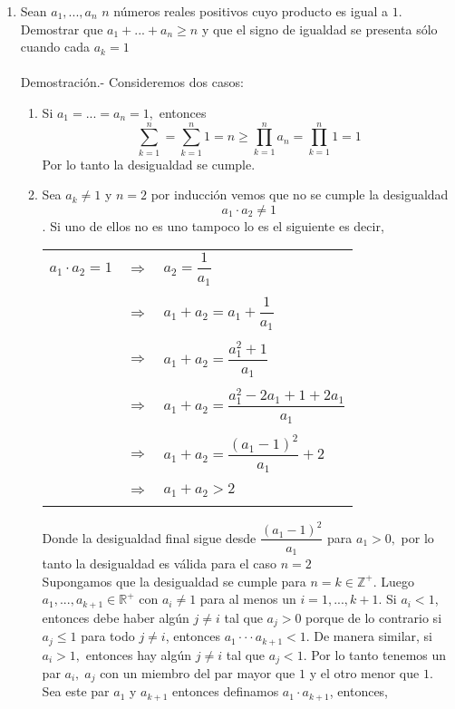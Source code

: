 \begin{enumerate}
\item Sean $a_1,...,a_n$  $n$ números reales positivos cuyo producto es igual a $1$. Demostrar que $a_1+...+a_n \geq n$ y que el signo de igualdad se presenta sólo cuando cada $a_k =1$\\\\
Demostración.- \; Consideremos dos casos:
\begin{enumerate}[C1]
\item Si $a_1=...=a_n=1,$ entonces 
$$\sum\limits_{k=1}^n = \sum\limits_{k=1}^n 1 = n \geq \prod\limits_{k=1}^n a_n = \prod\limits_{k=1}^n 1 = 1 $$
Por lo tanto la desigualdad se cumple.
\item Sea $a_k \neq 1$ y $n=2$ por inducción vemos que no se cumple la desigualdad $$a_1 \cdot a_2 \neq 1$$. Si uno de ellos no es uno tampoco lo es el siguiente es decir,
\begin{center}
\begin{tabular}{rcl}
$a_1 \cdot a_2 = 1$&$\Rightarrow$&$a_2 = \dfrac{1}{a_1}$\\\\
&$\Rightarrow$&$a_1 + a_2 = a_1 + \dfrac{1}{a_1}$\\\\
&$\Rightarrow$&$a_1 + a_2=\dfrac{a_1^2 + 1}{a_1}$\\\\
&$\Rightarrow$&$a_1 + a_2=\dfrac{a_1^2 - 2a_1 + 1 +2a_1}{a_1}$\\\\
&$\Rightarrow$&$a_1 + a_2=\dfrac{(a_1 - 1)^2}{a_1} + 2$\\\\
&$\Rightarrow$&$a_1 + a_2 > 2$\\\\
\end{tabular}
\end{center}
Donde la desigualdad final sigue desde $\dfrac{(a_1-1)^2}{a_1}$ para $a_1>0,$ por lo tanto la desigualdad es válida para el caso $n=2$\\
Supongamos que la desigualdad se cumple para $n=k \in \mathbb{Z}^+$. Luego $a_1,...,a_{k+1} \in \mathbb{R}^+$ con $a_i \neq 1$ para al menos un $i=1,...,k+1.$ Si $a_i < 1$, entonces debe haber algún $j\neq i$ tal que $a_j > 0$ porque de lo contrario si $a_j \leq 1$ para  todo $j\neq i$, entonces $a_1 \cdot \cdot \cdot a_{k+1}<1.$ De manera similar, si $a_i>1,$ entonces hay algún $j\neq i$ tal que $a_j <1.$ Por lo tanto tenemos un par $a_i, \; a_j$ con un miembro del par mayor que $1$ y el otro menor que $1$. Sea este par $a_1$ y $a_{k+1}$ entonces definamos $a_1 \cdot a_{k+1}$, entonces,

\end{enumerate}
\end{enumerate}
